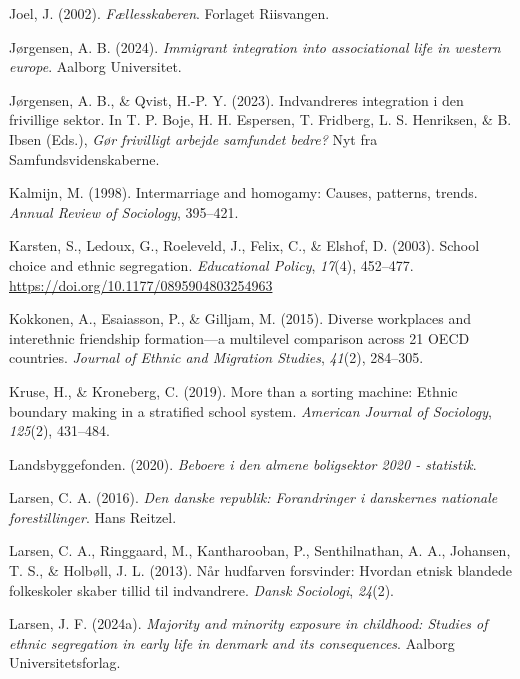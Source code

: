 \documentclass[
]{book}
\newlength{\cslhangindent}
\newenvironment{CSLReferences}[2] %
 {\begin{list}{}{%
  \setlength{\itemindent}{0pt}
  \setlength{\leftmargin}{0pt}
  \setlength{\parsep}{0pt}
  \ifodd #1
   \setlength{\leftmargin}{\cslhangindent}
   \setlength{\itemindent}{-1\cslhangindent}
  \fi
  \setlength{\itemsep}{#2\baselineskip}}}
 {\end{list}}
\begin{document}
\begin{CSLReferences}{1}{0}
Joel, J. (2002). \emph{Fællesskaberen}. Forlaget Riisvangen.

Jørgensen, A. B. (2024). \emph{Immigrant integration into associational life in western europe}. Aalborg Universitet.

Jørgensen, A. B., \& Qvist, H.-P. Y. (2023). Indvandreres integration i den frivillige sektor. In T. P. Boje, H. H. Espersen, T. Fridberg, L. S. Henriksen, \& B. Ibsen (Eds.), \emph{Gør frivilligt arbejde samfundet bedre?} Nyt fra Samfundsvidenskaberne.

Kalmijn, M. (1998). Intermarriage and homogamy: Causes, patterns, trends. \emph{Annual Review of Sociology}, 395--421.

Karsten, S., Ledoux, G., Roeleveld, J., Felix, C., \& Elshof, D. (2003). School choice and ethnic segregation. \emph{Educational Policy}, \emph{17}(4), 452--477. \url{https://doi.org/10.1177/0895904803254963}

Kokkonen, A., Esaiasson, P., \& Gilljam, M. (2015). Diverse workplaces and interethnic friendship formation---a multilevel comparison across 21 OECD countries. \emph{Journal of Ethnic and Migration Studies}, \emph{41}(2), 284--305.

Kruse, H., \& Kroneberg, C. (2019). More than a sorting machine: Ethnic boundary making in a stratified school system. \emph{American Journal of Sociology}, \emph{125}(2), 431--484.

Landsbyggefonden. (2020). \emph{Beboere i den almene boligsektor 2020 - statistik}.

Larsen, C. A. (2016). \emph{Den danske republik: Forandringer i danskernes nationale forestillinger}. Hans Reitzel.

Larsen, C. A., Ringgaard, M., Kantharooban, P., Senthilnathan, A. A., Johansen, T. S., \& Holbøll, J. L. (2013). Når hudfarven forsvinder: Hvordan etnisk blandede folkeskoler skaber tillid til indvandrere. \emph{Dansk Sociologi}, \emph{24}(2).

Larsen, J. F. (2024a). \emph{Majority and minority exposure in childhood: Studies of ethnic segregation in early life in denmark and its consequences}. Aalborg Universitetsforlag.


\end{CSLReferences}
\end{document}
